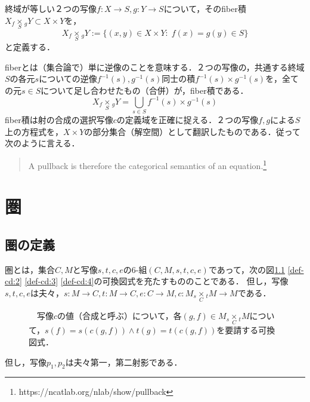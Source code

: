 \documentclass[uplatex, 12pt, dvipdfmx]{jsreport}
\begin{document}
\begin{shadebox}\begin{definition}終域が等しい２つの写像$f:X\rightarrow S, g:Y\rightarrow S$について，その\rm{fiber積}$X_f\underset{S}{\times}{}_gY\subset X\times Y$を，$$X_f\underset{S}{\times}{}_gY:=\{ (x,y)\in X\times Y:\; f(x)=g(y)\in S \}$$と定義する．  \end{definition}\end{shadebox}
fiberとは（集合論で）単に逆像のことを意味する．２つの写像の，共通する終域$S$の各元$s$についての逆像$f^{-1}(s),g^{-1}(s)$同士の積$f^{-1}(s)\times g^{-1}(s)$を，全ての元$s\in S$について足し合わせたもの（合併）が，fiber積である．$$X_f\underset{S}{\times}{}_gY=\bigcup_{s\in S}f^{-1}(s)\times g^{-1}(s)$$
fiber積は射の合成の選択写像$c$の定義域を正確に捉える．２つの写像$f,g$による$S$上の方程式を，$X\times Y$の部分集合（解空間）として翻訳したものである．従って次のように言える．

\begin{quote}
    A pullback is therefore the categorical semantics of an equation.\footnote{https://ncatlab.org/nlab/show/pullback}
\end{quote}

\clearpage

\chapter{圏}

\section{圏の定義}
\begin{shadebox}\begin{definition}[圏]\label{def-category}\rm{}圏とは，集合$C,M$と写像$s,t,c,e$の6-組$(C,M,s,t,c,e)$であって，次の図\ref{def-cd:1} \ref{def-cd:2} \ref{def-cd:3} \ref{def-cd:4}の可換図式を充たすもののことである．
    但し，写像$s,t,c,e$は夫々，$s:M\rightarrow C,t:M\rightarrow C,e:C\rightarrow M, c:M_s\underset{C}{\times}{}_tM \rightarrow M$である．
\end{definition}\end{shadebox}

\begin{figure}[ht] \begin{center}  \caption{\label{def-cd:1}　写像$c$の値（合成と呼ぶ）について，各$(g,f)\in M_s\underset{C}{\times}{}_tM$について，$s(f)=s(c(g,f))\wedge t(g)=t(c(g,f))$を要請する可換図式．}
\end{center}\end{figure}
但し，写像$p_1, p_2$は夫々第一，第二射影である．
\end{document}
